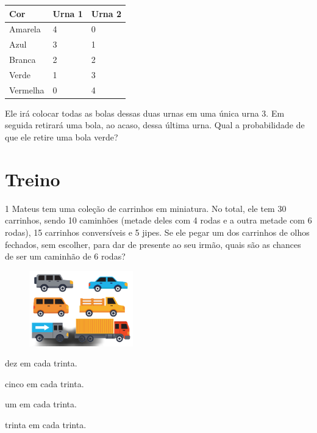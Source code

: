 \begin{longtable}[]{@{}lll@{}}
\toprule
\hline
\textbf{Cor} & \textbf{Urna 1} & \textbf{Urna 2}\tabularnewline
\hline
\midrule
\endhead
Amarela & 4 & 0\tabularnewline
\hline
Azul & 3 & 1\tabularnewline
\hline
Branca & 2 & 2\tabularnewline
\hline
Verde & 1 & 3\tabularnewline
\hline
Vermelha & 0 & 4\tabularnewline
\hline
\bottomrule
\end{longtable}


Ele irá colocar todas as bolas dessas duas urnas em uma única urna 3. Em
seguida retirará uma bola, ao acaso, dessa última urna. Qual a
probabilidade de que ele retire uma bola verde?

\pagebreak
\section*{Treino}

\num{1} Mateus tem uma coleção de carrinhos em miniatura. No total, ele tem 30 carrinhos, sendo 10 caminhões (metade deles com 4 rodas e a outra metade com 6 rodas), 15 carrinhos conversíveis e 5 jipes. Se ele pegar um dos carrinhos de olhos fechados, sem escolher, para dar de presente ao seu irmão, quais são as chances de ser um caminhão de 6 rodas?

\begin{figure}[htpb!]
\centering
\includegraphics[width=0.4\textwidth]{./media/image75f.png}
\end{figure}

\begin{escolha}
\begin{multicols}{2}
\item
  dez em cada trinta.
\item
  cinco em cada trinta.
\item
  um em cada trinta.
\item
  trinta em cada trinta.
\end{multicols}
\end{escolha}


